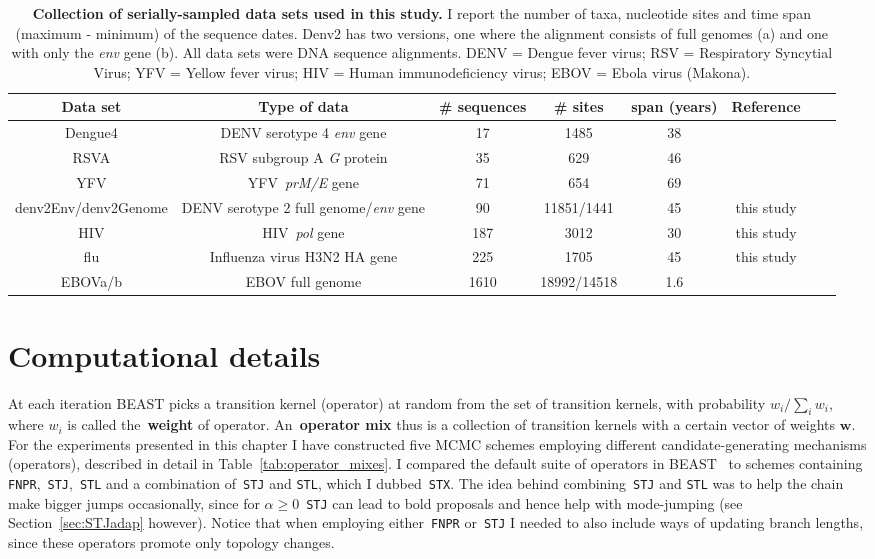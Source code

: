 \begin{sidewaystable}[!ht]
\caption[Collection of serially-sampled data sets.]{\textbf{Collection of serially-sampled data sets used in this study.}
I report the number of taxa, nucleotide sites and time span (maximum - minimum) of the sequence dates.
Denv2 has two versions, one where the alignment consists of full genomes  (a) and one with only the \textit{env} gene (b).
All data sets were DNA sequence alignments.
DENV = Dengue fever virus; RSV = Respiratory Syncytial Virus; YFV = Yellow fever virus; HIV = Human immunodeficiency virus; EBOV = Ebola virus (Makona).
}
\begin{center}
\begin{tabular}{cccccccc}
\toprule
Data set & Type of data	& \# sequences & \# sites & span (years) & Reference \\             
\midrule
Dengue4 & DENV serotype 4 \textit{env} gene& 17  & 1485 & 38 & \cite{Lanciotti1997}\\
RSVA & RSV subgroup A \textit{G} protein & 35 & 629 & 46& \cite{Zlateva2004}\\
YFV & YFV~\textit{prM/E} gene & 71  & 654 & 69 & \cite{Bryant2007}\\
denv2Env/denv2Genome & DENV serotype 2 full genome/\textit{env} gene & 90  & 11851/1441 & 45 & this study\\
HIV & HIV~\textit{pol} gene & 187 & 3012 & 30 & this study\\
flu & Influenza virus H3N2 HA gene & 225  & 1705 & 45 & this study\\
EBOVa/b & EBOV full genome & 1610 & 18992/14518 & 1.6 &~\cite{Dudas2017} \\
\bottomrule
\end{tabular}
\end{center}
 \label{tab:datasets}
\end{sidewaystable}

\section{Computational details}
\label{sec:compdetails}

At each iteration BEAST picks a transition kernel (operator) at random from the set of transition kernels, with probability $w_i/\sum_i w_i$, where $w_i$ is called the~\textbf{weight} of operator.
An~\textbf{operator mix} thus is a collection of transition kernels with a certain vector of weights $\boldsymbol w$.
For the experiments presented in this chapter I have constructed five MCMC schemes employing different candidate-generating mechanisms (operators), described in detail in Table~\ref{tab:operator_mixes}.
I compared the default suite of operators in BEAST~\citep{Drummond2012} to schemes containing \verb|FNPR|,~\verb|STJ|,~\verb|STL| and a combination of~\verb|STJ| and \verb|STL|, which I dubbed~\verb|STX|.
The idea behind combining~\verb|STJ| and \verb|STL| was to help the chain make bigger jumps occasionally, since for $\alpha \geq 0$~\verb|STJ| can lead to bold proposals and hence help with mode-jumping (see Section~\ref{sec:STJadap} however).
Notice that when employing either~\verb|FNPR| or~\verb|STJ| I needed to also include ways of updating branch lengths, since these operators promote only topology changes.

